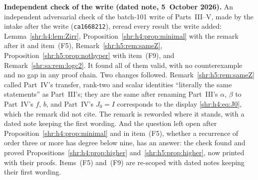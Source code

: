 \documentclass[11pt,letterpaper]{article}
\numberwithin{equation}{section}
\theoremstyle{definition}
\newcommand{\1}{\mathbf 1}
\begin{document}
\textbf{Independent check of the write (dated note, 5~October 2026).}
An independent adversarial check of the batch-101 write of Parts~III--V,
made by the intake after the write (\texttt{ca1668212}), reread every
result the write added: Lemma~\ref{shr:h4:lem:Zirr},
Proposition~\ref{shr:h4:prop:minimal} with the remark after it and
item~(F5), Remark~\ref{shr:h5:rem:sameZ},
Proposition~\ref{shr:h5:prop:nothyper} with item~(F9), and
Remark~\ref{shr:sa:rem:logc2}. It found all of them valid, with no
counterexample and no gap in any proof chain. Two changes followed.
Remark~\ref{shr:h5:rem:sameZ} called Part~IV's transfer, rank-two and
scalar identities ``literally the same statements'' as Part~III's; they
are the same after renaming Part~III's $\alpha$, $\beta$ to Part~IV's $f$,
$b$, and Part~IV's $J_0=I$ corresponds to the display
\eqref{shr:h4:eq:J0}, which the remark did not cite. The remark is
reworded where it stands, with a dated note keeping the first wording. And
the question left open after Proposition~\ref{shr:h4:prop:minimal} and in
item~(F5), whether a recurrence of order three or more has degree below
nine, has an answer: the check found and proved
Propositions~\ref{shr:h4:prop:higher} and~\ref{shr:h5:prop:higher}, now
printed with their proofs. Items~(F5) and~(F9) are re-scoped with dated
notes keeping their first wording.
\end{document}
